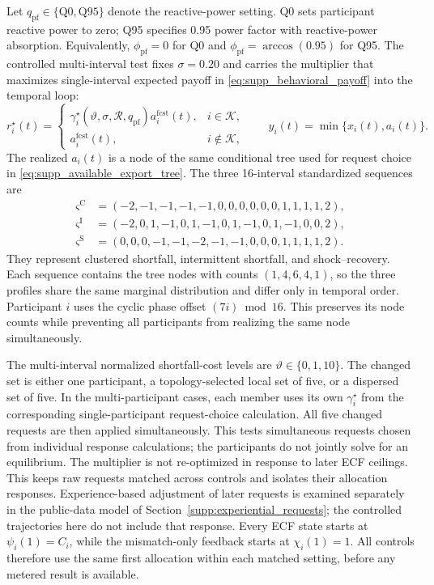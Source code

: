 \documentclass[11pt]{article}
\begin{document}
Let $q_{\mathrm{pf}}\in\{\mathrm{Q0},\mathrm{Q95}\}$ denote the reactive-power
setting. Q0 sets participant reactive power to zero; Q95 specifies 0.95 power
factor with reactive-power absorption. Equivalently,
$\phi_{\mathrm{pf}}=0$ for Q0 and
$\phi_{\mathrm{pf}}=\arccos(0.95)$ for Q95. The controlled multi-interval test
fixes $\sigma=0.20$ and carries the multiplier that maximizes single-interval
expected payoff in
\eqref{eq:supp_behavioral_payoff} into the temporal loop:
\begin{equation}
r_i^\star(t)=
\begin{cases}
\gamma_i^\star(\vartheta,\sigma,\mathcal R,q_{\mathrm{pf}})a_i^{\mathrm{fcst}}(t),
&i\in\mathcal K,\\
a_i^{\mathrm{fcst}}(t),&i\notin\mathcal K,
\end{cases}
\qquad
y_i(t)=\min\{x_i(t),a_i(t)\}.
\label{eq:supp_dynamic_test_inputs}
\end{equation}
The realized $a_i(t)$ is a node of the same conditional tree used for request
choice in \eqref{eq:supp_available_export_tree}. The three 16-interval
standardized sequences are
\begin{align}
\boldsymbol\varsigma^{\mathrm C}&=(-2,-1,-1,-1,-1,0,0,0,0,0,0,1,1,1,1,2),\nonumber
\\
\boldsymbol\varsigma^{\mathrm I}&=(-2,0,1,-1,0,1,-1,0,1,-1,0,1,-1,0,0,2),\nonumber
\\
\boldsymbol\varsigma^{\mathrm S}&=(0,0,0,-1,-1,-2,-1,-1,0,0,0,1,1,1,1,2).
\label{eq:supp_exact_frequency_profiles}
\end{align}
They represent clustered shortfall, intermittent shortfall, and
shock--recovery. Each sequence contains the tree nodes with counts
$(1,4,6,4,1)$, so the three profiles share the same marginal distribution and
differ only in temporal order. Participant $i$ uses the cyclic phase offset
$(7i)\bmod16$. This preserves its node counts while preventing all participants
from realizing the same node simultaneously.

The multi-interval normalized shortfall-cost levels are
$\vartheta\in\{0,1,10\}$. The changed set is
either one participant, a topology-selected local set of five, or a dispersed set
of five. In the multi-participant cases, each member uses its own
$\gamma_i^\star$ from the corresponding single-participant request-choice calculation.
All five changed requests are then applied simultaneously. This tests simultaneous requests chosen from individual response calculations;
the participants do not jointly solve for an equilibrium.
The multiplier is not re-optimized in response to later ECF ceilings. This
keeps raw requests matched across controls and isolates their allocation
responses. Experience-based adjustment of later requests is examined separately
in the public-data model of Section~\ref{supp:experiential_requests}; the
controlled trajectories here do not include that response.
Every ECF state starts at $\psi_i(1)=C_i$, while the
mismatch-only feedback starts at $\chi_i(1)=1$. All controls therefore use the
same first allocation within each matched setting, before any metered result is
available.
\end{document}
